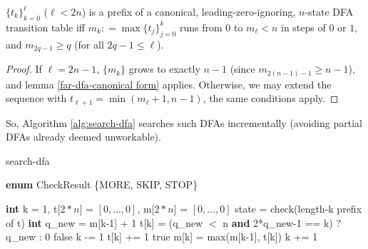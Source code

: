 \begin{corollary}\normalfont
  $\{t_k\}_{k=0}^\ell$ ($\ell<2n$) is a prefix of a canonical, leading-zero-ignoring, $n$-state DFA transition table iff
  $m_k \mathrel{\mathop:}= \max\{t_j\}_{j=0}^k$ runs from $0$ to $m_\ell<n$ in steps of $0$ or $1$, and $m_{2q-1}\ge q$ (for all $2q - 1 \le \ell$).
\end{corollary}
\begin{proof}
  If $\ell=2n-1$, $\{m_k\}$ grows to exactly $n-1$ (since $m_{2(n-1)-1}\ge n-1$), and lemma \ref{far-dfa-canonical form} applies.
  Otherwise, we may extend the sequence with $t_{\ell+1}=\min(m_\ell+1,n-1)$, the same conditions apply.
\end{proof}

So, Algorithm \ref{alg:search-dfa} searches such DFAs incrementally (avoiding partial DFAs already deemed unworkable).

\begin{algorithm}
  \caption{{\sc search-dfa}}\label{alg:search-dfa}

  \begin{algorithmic}[1]
    \State \textbf{enum} CheckResult \{MORE, SKIP, STOP\}
    \Statex

    \State \textbf{int} k = 1, t[$2*n$] = $[0,\ldots,0]$, m[$2*n$] = $[0,\ldots,0]$
    \Loop
    \State state = check(length-k prefix of t)
    \State \textbf{int} q\_new = m[k-1] + 1
    \State t[k] = (q\_new $<$ \textrm{n} \textbf{and} 2*q\_new-1 == k) ? q\_new : 0
    \Repeat
    \Return false
    \EndIf
    \State k -= 1
    \State t[k] += 1
    \Else\;\Return true
    \EndIf
    \State m[k] = max(m[k-1], t[k])
    \State k += 1
    \EndLoop
    \EndProcedure

  \end{algorithmic}
\end{algorithm}


